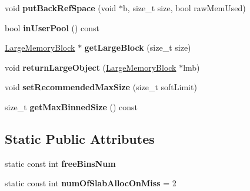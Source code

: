 \begin{DoxyCompactItemize}
\item 
\hypertarget{classrml_1_1internal_1_1Backend_aea0c24168ec12311166cfe8d596601d2}{}void {\bfseries put\+Back\+Ref\+Space} (void $\ast$b, size\+\_\+t size, bool raw\+Mem\+Used)\label{classrml_1_1internal_1_1Backend_aea0c24168ec12311166cfe8d596601d2}

\item 
\hypertarget{classrml_1_1internal_1_1Backend_a5689332d3e49d110391e2081c03027b6}{}bool {\bfseries in\+User\+Pool} () const \label{classrml_1_1internal_1_1Backend_a5689332d3e49d110391e2081c03027b6}

\item 
\hypertarget{classrml_1_1internal_1_1Backend_a1f5acf305c3d2985141a51fa5fb7c111}{}\hyperlink{structrml_1_1internal_1_1LargeMemoryBlock}{Large\+Memory\+Block} $\ast$ {\bfseries get\+Large\+Block} (size\+\_\+t size)\label{classrml_1_1internal_1_1Backend_a1f5acf305c3d2985141a51fa5fb7c111}

\item 
\hypertarget{classrml_1_1internal_1_1Backend_a737a839bc504ba985ca6d2b4578bd093}{}void {\bfseries return\+Large\+Object} (\hyperlink{structrml_1_1internal_1_1LargeMemoryBlock}{Large\+Memory\+Block} $\ast$lmb)\label{classrml_1_1internal_1_1Backend_a737a839bc504ba985ca6d2b4578bd093}

\item 
\hypertarget{classrml_1_1internal_1_1Backend_a33e5d8efd232fd64c866c02bc06e3c97}{}void {\bfseries set\+Recommended\+Max\+Size} (size\+\_\+t soft\+Limit)\label{classrml_1_1internal_1_1Backend_a33e5d8efd232fd64c866c02bc06e3c97}

\item 
\hypertarget{classrml_1_1internal_1_1Backend_aa4915a88a282ee317a97b377d1abfc3f}{}size\+\_\+t {\bfseries get\+Max\+Binned\+Size} () const \label{classrml_1_1internal_1_1Backend_aa4915a88a282ee317a97b377d1abfc3f}

\end{DoxyCompactItemize}
\subsection*{Static Public Attributes}
\begin{DoxyCompactItemize}
\item 
static const int {\bfseries free\+Bins\+Num}
\item 
\hypertarget{classrml_1_1internal_1_1Backend_a37fd2d10ce777e87cc7ddfe55249f0f6}{}static const int {\bfseries num\+Of\+Slab\+Alloc\+On\+Miss} = 2\label{classrml_1_1internal_1_1Backend_a37fd2d10ce777e87cc7ddfe55249f0f6}

\end{DoxyCompactItemize}


